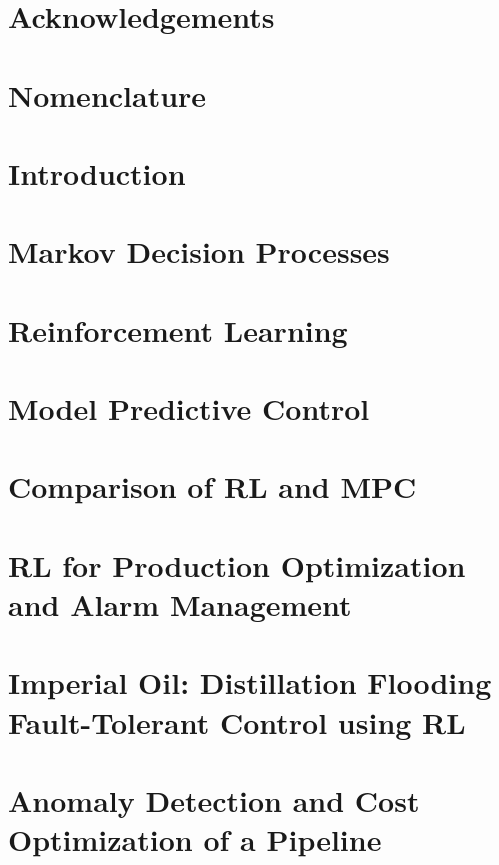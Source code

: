 \documentclass[12pt]{report}
\begin{document}
\tableofcontents
\listoffigures
\listoftables

\chapter*{Acknowledgements}

\chapter*{Nomenclature}

\chapter{Introduction}


\chapter{Markov Decision Processes}


\chapter{Reinforcement Learning}


\chapter{Model Predictive Control}


\chapter{Comparison of RL and MPC}


\chapter{RL for Production Optimization and Alarm Management}


\chapter{Imperial Oil: Distillation Flooding Fault-Tolerant Control using RL}


\chapter{Anomaly Detection and Cost Optimization of a Pipeline}

\end{document}
